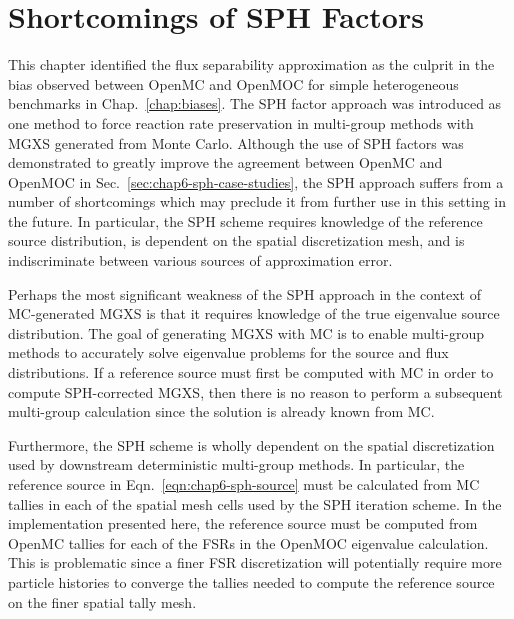 
\section{Shortcomings of SPH Factors}
\label{sec:chap6-sph-shortcomings}

This chapter identified the flux separability approximation as the culprit in the bias observed between OpenMC and OpenMOC for simple heterogeneous benchmarks in Chap.~\ref{chap:biases}. The \ac{SPH} factor approach was introduced as one method to force reaction rate preservation in multi-group methods with \ac{MGXS} generated from Monte Carlo. Although the use of \ac{SPH} factors was demonstrated to greatly improve the agreement between OpenMC and OpenMOC in Sec.~\ref{sec:chap6-sph-case-studies}, the \ac{SPH} approach suffers from a number of shortcomings which may preclude it from further use in this setting in the future. In particular, the \ac{SPH} scheme requires knowledge of the reference source distribution, is dependent on the spatial discretization mesh, and is indiscriminate between various sources of approximation error.

Perhaps the most significant weakness of the \ac{SPH} approach in the context of \ac{MC}-generated \ac{MGXS} is that it requires knowledge of the true eigenvalue source distribution. The goal of generating \ac{MGXS} with \ac{MC} is to enable multi-group methods to accurately solve eigenvalue problems for the source and flux distributions. If a reference source must first be computed with \ac{MC} in order to compute \ac{SPH}-corrected \ac{MGXS}, then there is no reason to perform a subsequent multi-group calculation since the solution is already known from \ac{MC}.

Furthermore, the \ac{SPH} scheme is wholly dependent on the spatial discretization used by downstream deterministic multi-group methods. In particular, the reference source in Eqn.~\ref{eqn:chap6-sph-source} must be calculated from \ac{MC} tallies in each of the spatial mesh cells used by the \ac{SPH} iteration scheme. In the implementation presented here, the reference source must be computed from OpenMC tallies for each of the \ac{FSR}s in the OpenMOC eigenvalue calculation. This is problematic since a finer \ac{FSR} discretization will potentially require more particle histories to converge the tallies needed to compute the reference source on the finer spatial tally mesh.

